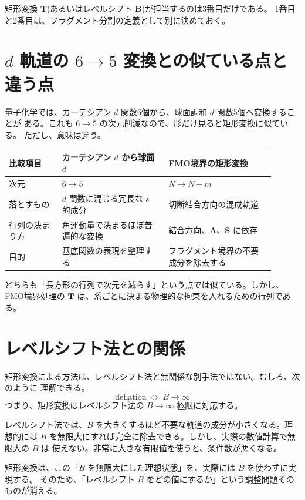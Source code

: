 \documentclass[uplatex,dvipdfmx,11pt]{jsarticle}
\newcommand{\Smat}{\mathbf S}
\newcommand{\Amat}{\mathbf A}
\newcommand{\Bmat}{\mathbf B}
\newcommand{\Tmat}{\mathbf T}
\begin{document}
矩形変換 \(\Tmat\)(あるいはレベルシフト \(\Bmat\))が担当するのは3番目だけである。
1番目と2番目は、フラグメント分割の定義として別に決めておく。

\section{\(d\) 軌道の \(6\to5\) 変換との似ている点と違う点}

量子化学では、カーテシアン \(d\) 関数6個から、球面調和 \(d\) 関数5個へ変換することが
ある。これも \(6\to5\) の次元削減なので、形だけ見ると矩形変換に似ている。
ただし、意味は違う。

\begin{center}
\begin{tabular}{|p{0.18\linewidth}|p{0.36\linewidth}|p{0.36\linewidth}|}
\hline
\textbf{比較項目} & \textbf{カーテシアン \(d\) から球面 \(d\)} & \textbf{FMO境界の矩形変換} \\
\hline
次元 & \(6\to5\) & \(N\to N-m\) \\
\hline
落とすもの & \(d\) 関数に混じる冗長な \(s\) 的成分 & 切断結合方向の混成軌道 \\
\hline
行列の決まり方 & 角運動量で決まるほぼ普遍的な変換 & 結合方向、\(\Amat\)、\(\Smat\) に依存 \\
\hline
目的 & 基底関数の表現を整理する & フラグメント境界の不要成分を除去する \\
\hline
\end{tabular}
\end{center}

どちらも「長方形の行列で次元を減らす」という点では似ている。しかし、FMO境界処理の
\(\Tmat\) は、系ごとに決まる物理的な拘束を入れるための行列である。

\section{レベルシフト法との関係}

矩形変換による方法は、レベルシフト法と無関係な別手法ではない。むしろ、次のように
理解できる。
\[
  \boxed{\text{deflation}\ \Longleftrightarrow\ B\to\infty}
\]
つまり、矩形変換はレベルシフト法の \(B\to\infty\) 極限に対応する。

レベルシフト法では、\(B\) を大きくするほど不要な軌道の成分が小さくなる。理想的には
\(B\) を無限大にすれば完全に除去できる。しかし、実際の数値計算で無限大の \(B\) は
使えない。非常に大きな有限値を使うと、条件数が悪くなる。

矩形変換は、この「\(B\) を無限大にした理想状態」を、実際には \(B\) を使わずに実現する。
そのため、「レベルシフト \(B\) をどの値にするか」という調整問題そのものが消える。
\end{document}
